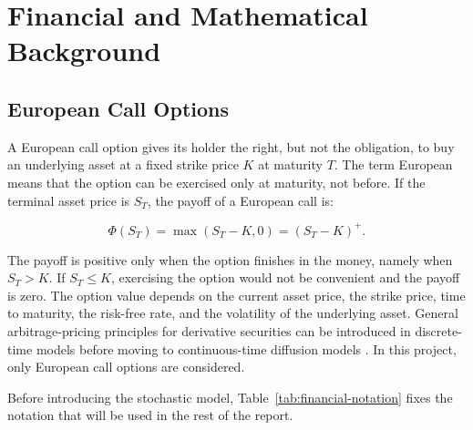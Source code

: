 \chapter{Financial and Mathematical Background}

\section{European Call Options}

A European call option gives its holder the right, but not the obligation, to buy an underlying asset at a fixed strike price $K$ at maturity $T$.
The term European means that the option can be exercised only at maturity, not before.
If the terminal asset price is $S_T$, the payoff of a European call is:

\begin{equation}
    \Phi(S_T) = \max(S_T - K, 0) = (S_T - K)^+.
\end{equation}

The payoff is positive only when the option finishes in the money, namely when $S_T > K$.
If $S_T \leq K$, exercising the option would not be convenient and the payoff is zero.
The option value depends on the current asset price, the strike price, time to maturity, the risk-free rate, and the volatility of the underlying asset.
General arbitrage-pricing principles for derivative securities can be introduced in discrete-time models before moving to continuous-time diffusion models \cite{shreve2004stochastic1,pascucci2012financial}.
In this project, only European call options are considered.

Before introducing the stochastic model, Table~\ref{tab:financial-notation} fixes the notation that will be used in the rest of the report.

